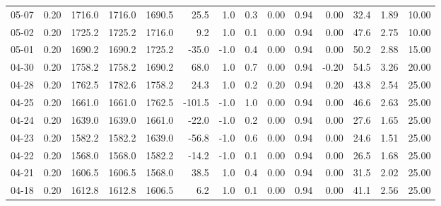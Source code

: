 \begin{threeparttable}
{\begin{tabular}{lrrrrrrrrrrrrr}
  05-07 &     0.20 & 1716.0 & 1716.0 & 1690.5 &       25.5 &                      1.0 &                 0.3 &       0.00 &      0.94 &           0.00 &             32.4 &            1.89 &                  10.00 \\
  05-02 &     0.20 & 1725.2 & 1725.2 & 1716.0 &        9.2 &                      1.0 &                 0.1 &       0.00 &      0.94 &           0.00 &             47.6 &            2.75 &                  10.00 \\
  05-01 &     0.20 & 1690.2 & 1690.2 & 1725.2 &      -35.0 &                     -1.0 &                 0.4 &       0.00 &      0.94 &           0.00 &             50.2 &            2.88 &                  15.00 \\
  04-30 &     0.20 & 1758.2 & 1758.2 & 1690.2 &       68.0 &                      1.0 &                 0.7 &       0.00 &      0.94 &          -0.20 &             54.5 &            3.26 &                  20.00 \\
  04-28 &     0.20 & 1762.5 & 1782.6 & 1758.2 &       24.3 &                      1.0 &                 0.2 &       0.20 &      0.94 &           0.20 &             43.8 &            2.54 &                  25.00 \\
  04-25 &     0.20 & 1661.0 & 1661.0 & 1762.5 &     -101.5 &                     -1.0 &                 1.0 &       0.00 &      0.94 &           0.00 &             46.6 &            2.63 &                  25.00 \\
  04-24 &     0.20 & 1639.0 & 1639.0 & 1661.0 &      -22.0 &                     -1.0 &                 0.2 &       0.00 &      0.94 &           0.00 &             27.6 &            1.65 &                  25.00 \\
  04-23 &     0.20 & 1582.2 & 1582.2 & 1639.0 &      -56.8 &                     -1.0 &                 0.6 &       0.00 &      0.94 &           0.00 &             24.6 &            1.51 &                  25.00 \\
  04-22 &     0.20 & 1568.0 & 1568.0 & 1582.2 &      -14.2 &                     -1.0 &                 0.1 &       0.00 &      0.94 &           0.00 &             26.5 &            1.68 &                  25.00 \\
  04-21 &     0.20 & 1606.5 & 1606.5 & 1568.0 &       38.5 &                      1.0 &                 0.4 &       0.00 &      0.94 &           0.00 &             31.5 &            2.02 &                  25.00 \\
  04-18 &     0.20 & 1612.8 & 1612.8 & 1606.5 &        6.2 &                      1.0 &                 0.1 &       0.00 &      0.94 &           0.00 &             41.1 &            2.56 &                  25.00 \\

\end{tabular}}
\end{threeparttable}
